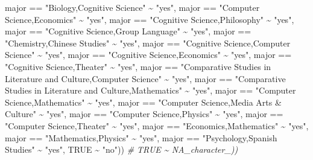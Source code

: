 \documentclass[
]{article}
\newenvironment{Shaded}{\begin{snugshade}}{\end{snugshade}}
\newcommand{\CommentTok}[1]{\textcolor[rgb]{0.56,0.35,0.01}{\textit{#1}}}
\newcommand{\ConstantTok}[1]{\textcolor[rgb]{0.00,0.00,0.00}{#1}}
\newcommand{\NormalTok}[1]{#1}
\newcommand{\SpecialCharTok}[1]{\textcolor[rgb]{0.00,0.00,0.00}{#1}}
\newcommand{\StringTok}[1]{\textcolor[rgb]{0.31,0.60,0.02}{#1}}
\begin{document}
\begin{Shaded}
\begin{Highlighting}[]
\NormalTok{    major }\SpecialCharTok{==} \StringTok{"Biology,Cognitive Science"} \SpecialCharTok{\textasciitilde{}} \StringTok{"yes"}\NormalTok{,}
\NormalTok{    major }\SpecialCharTok{==} \StringTok{"Computer Science,Economics"} \SpecialCharTok{\textasciitilde{}} \StringTok{"yes"}\NormalTok{,}
\NormalTok{    major }\SpecialCharTok{==} \StringTok{"Cognitive Science,Philosophy"} \SpecialCharTok{\textasciitilde{}} \StringTok{"yes"}\NormalTok{,}
\NormalTok{    major }\SpecialCharTok{==} \StringTok{"Cognitive Science,Group Language"} \SpecialCharTok{\textasciitilde{}} \StringTok{"yes"}\NormalTok{,}
\NormalTok{    major }\SpecialCharTok{==} \StringTok{"Chemistry,Chinese Studies"} \SpecialCharTok{\textasciitilde{}} \StringTok{"yes"}\NormalTok{,}
\NormalTok{    major }\SpecialCharTok{==} \StringTok{"Cognitive Science,Computer Science"} \SpecialCharTok{\textasciitilde{}} \StringTok{"yes"}\NormalTok{,}
\NormalTok{    major }\SpecialCharTok{==} \StringTok{"Cognitive Science,Economics"} \SpecialCharTok{\textasciitilde{}} \StringTok{"yes"}\NormalTok{,}
\NormalTok{    major }\SpecialCharTok{==} \StringTok{"Cognitive Science,Theater"} \SpecialCharTok{\textasciitilde{}} \StringTok{"yes"}\NormalTok{,}
\NormalTok{    major }\SpecialCharTok{==} \StringTok{"Comparative Studies in Literature and Culture,Computer Science"} \SpecialCharTok{\textasciitilde{}} \StringTok{"yes"}\NormalTok{,}
\NormalTok{    major }\SpecialCharTok{==} \StringTok{"Comparative Studies in Literature and Culture,Mathematics"} \SpecialCharTok{\textasciitilde{}} \StringTok{"yes"}\NormalTok{,}
\NormalTok{    major }\SpecialCharTok{==} \StringTok{"Computer Science,Mathematics"} \SpecialCharTok{\textasciitilde{}} \StringTok{"yes"}\NormalTok{,}
\NormalTok{    major }\SpecialCharTok{==} \StringTok{"Computer Science,Media Arts \& Culture"} \SpecialCharTok{\textasciitilde{}} \StringTok{"yes"}\NormalTok{,}
\NormalTok{    major }\SpecialCharTok{==} \StringTok{"Computer Science,Physics"} \SpecialCharTok{\textasciitilde{}} \StringTok{"yes"}\NormalTok{,}
\NormalTok{    major }\SpecialCharTok{==} \StringTok{"Computer Science,Theater"} \SpecialCharTok{\textasciitilde{}} \StringTok{"yes"}\NormalTok{,}
\NormalTok{    major }\SpecialCharTok{==} \StringTok{"Economics,Mathematics"} \SpecialCharTok{\textasciitilde{}} \StringTok{"yes"}\NormalTok{,}
\NormalTok{    major }\SpecialCharTok{==} \StringTok{"Mathematics,Physics"} \SpecialCharTok{\textasciitilde{}} \StringTok{"yes"}\NormalTok{,}
\NormalTok{    major }\SpecialCharTok{==} \StringTok{"Psychology,Spanish Studies"} \SpecialCharTok{\textasciitilde{}} \StringTok{"yes"}\NormalTok{,}
    \ConstantTok{TRUE} \SpecialCharTok{\textasciitilde{}} \StringTok{"no"}\NormalTok{))}
    \CommentTok{\# TRUE \textasciitilde{} NA\_character\_))}
\end{Highlighting}
\end{Shaded}
\end{document}
